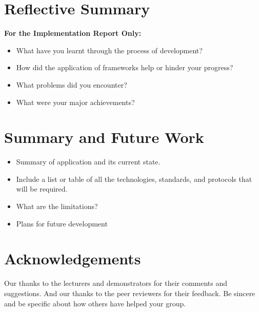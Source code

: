 \documentclass{sig-alt-release2}
\begin{document}
\section{Reflective Summary}
{\bf For the Implementation Report Only:}
\begin{itemize}
\item	What have you learnt through the process of development? 
\item	How did the application of frameworks help or hinder your progress? 
\item	What problems did you encounter? 
\item	What were your major achievements?
\end{itemize}

\section{Summary and Future Work}
\begin{itemize}
\item	Summary of application and its current state.
\item	Include a list or table of all the technologies, standards, and protocols that will be required.
\item	What are the limitations?
\item Plans for future development
\end{itemize}

\section{Acknowledgements}
Our thanks to the lecturers and demonstrators for their comments and suggestions. And our thanks to the peer reviewers for their feedback.
Be sincere and be specific about how others have helped your group.




\end{document}
